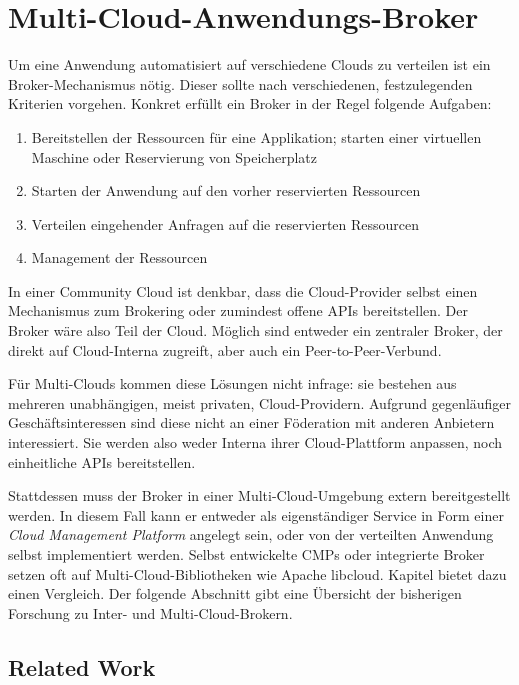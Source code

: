 \chapter{Multi-Cloud-Anwendungs-Broker}

Um eine Anwendung automatisiert auf verschiedene Clouds zu verteilen ist ein Broker-Mechanismus nötig. Dieser sollte nach verschiedenen, festzulegenden Kriterien vorgehen. Konkret erfüllt ein Broker in der Regel folgende Aufgaben:

\begin{enumerate}
	\item Bereitstellen der Ressourcen für eine Applikation; starten einer virtuellen Maschine oder Reservierung von Speicherplatz
	\item Starten der Anwendung auf den vorher reservierten Ressourcen
	\item Verteilen eingehender Anfragen auf die reservierten Ressourcen
	\item Management der Ressourcen
\end{enumerate}

\noindent In einer Community Cloud ist denkbar, dass die Cloud-Provider selbst einen Mechanismus zum Brokering oder zumindest offene APIs bereitstellen. Der Broker wäre also Teil der Cloud. Möglich sind entweder ein zentraler Broker, der direkt auf Cloud-Interna zugreift, aber auch ein Peer-to-Peer-Verbund.

Für Multi-Clouds kommen diese Lösungen nicht infrage: sie bestehen aus mehreren unabhängigen, meist privaten, Cloud-Providern. Aufgrund gegenläufiger Geschäftsinteressen sind diese nicht an einer Föderation mit anderen Anbietern interessiert. Sie werden also weder Interna ihrer Cloud-Plattform anpassen, noch einheitliche APIs bereitstellen.

Stattdessen muss der Broker in einer Multi-Cloud-Umgebung extern bereitgestellt werden. In diesem Fall kann er entweder als eigenständiger Service in Form einer \emph{Cloud Management Platform} angelegt sein, oder von der verteilten Anwendung selbst implementiert werden. Selbst entwickelte CMPs oder integrierte Broker setzen oft auf Multi-Cloud-Bibliotheken wie Apache libcloud. Kapitel  bietet dazu einen Vergleich. Der folgende Abschnitt gibt eine Übersicht der bisherigen Forschung zu Inter- und Multi-Cloud-Brokern.

\section{Related Work}

